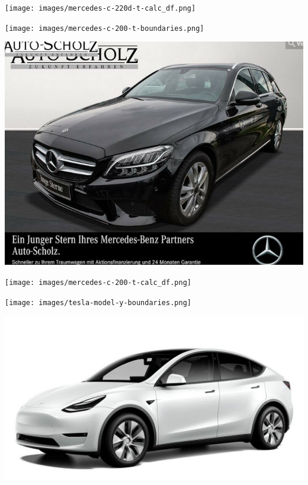 \documentclass[landscape, DIV=99]{scrartcl}
\begin{document}
\pagebreak

\onecolumn
\null
\vfill 
\begin{center}
\texttt{[image: images/mercedes-c-220d-t-calc\_df.png]}
\end{center}
\vfill 
    
\twocolumn
\null
\vfill 
\texttt{[image: images/mercedes-c-200-t-boundaries.png]}
\vfill 

\pagebreak

\null
\vfill 
\includegraphics[width=\columnwidth]{cars/mercedes-c-200-t.png}
\vfill 

\pagebreak

\onecolumn
\null
\vfill 
\begin{center}
\texttt{[image: images/mercedes-c-200-t-calc\_df.png]}
\end{center}
\vfill 
    
\twocolumn
\null
\vfill 
\texttt{[image: images/tesla-model-y-boundaries.png]}
\vfill 

\pagebreak

\null
\vfill 
\includegraphics[width=\columnwidth]{cars/tesla-model-y.jpg}
\vfill 
\end{document}
